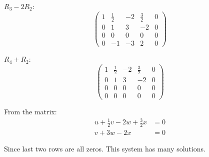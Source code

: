 $R_3 - 2R_2$:
\[
	\left(\begin{array}{cccc|c}
			1 & \frac{1}{2} & -2 & \frac{3}{2} & 0 \\
			0 & 1           & 3  & -2          & 0 \\
			0 & 0           & 0  & 0           & 0 \\
			0 & -1          & -3 & 2           & 0
		\end{array}\right)
\]

$R_4 + R_2$:
\[
	\left(\begin{array}{cccc|c}
			1 & \frac{1}{2} & -2 & \frac{3}{2} & 0 \\
			0 & 1           & 3  & -2          & 0 \\
			0 & 0           & 0  & 0           & 0 \\
			0 & 0           & 0  & 0           & 0
		\end{array}\right)
\]

From the matrix:
\begin{align*}
	u + \frac{1}{2}v - 2w + \frac{3}{2}x & = 0 \\
	v + 3w - 2x                          & = 0
\end{align*}

Since last two rows are all zeros. This system has many solutions.
